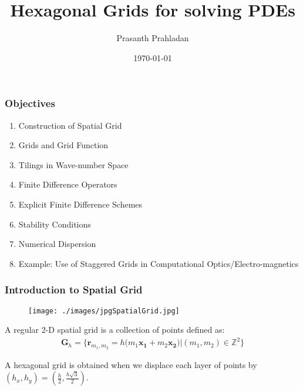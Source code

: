 \documentclass{beamer}
\title[APPM 7400: HW\#1]{Hexagonal Grids for solving PDEs} %
\author[Prasanth Prahladan]{Prasanth Prahladan} %
\institute[CU Boulder] %
{University of Colorado Boulder  \\ %
\medskip
}
\date{\today} %
\begin{document}
\scriptsize

\begin{frame}
\titlepage %
\end{frame}


\begin{frame}
\frametitle{Objectives}
\begin{enumerate}
\item Construction of Spatial Grid
\item Grids and Grid Function
\item Tilings in Wave-number Space
\item Finite Difference Operators
\item Explicit Finite Difference Schemes
\item Stability Conditions 
\item Numerical Dispersion
\item Example: Use of Staggered Grids in Computational Optics/Electro-magnetics
\end{enumerate}

\end{frame}


\begin{frame}
\frametitle{Introduction to Spatial Grid}
\begin{figure}
\texttt{[image: ./images/jpgSpatialGrid.jpg]}
\label{fig:spatialGrid}
\end{figure}

A regular 2-D spatial grid is a collection of points defined as:
\begin{align*}
\mathbf{G}_h = \bigg\{\mathbf{r}_{m_1, m_2} = h \big( m_1 \mathbf{x_1} + m_2 \mathbf{x_2} \big) | (m_1,m_2) \in \mathbb{Z}^2\bigg\}
\end{align*}

A hexagonal grid is obtained when we displace each layer of points by $(h_x, h_y) = (\frac{h}{2}, \frac{h\sqrt{3}}{2})$.
\end{frame}
\end{document}
